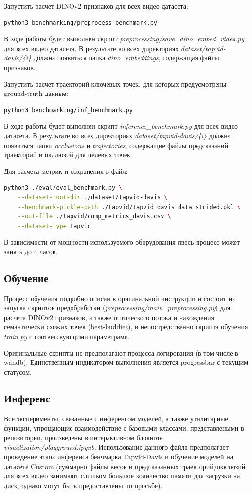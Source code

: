 \documentclass[a4paper, 14pt]{extarticle}
\theoremstyle{definition}
\theoremstyle{plain}
\theoremstyle{remark}
\begin{document}
Запустить расчет DINOv2 признаков для всех видео датасета:
\begin{lstlisting}[language=bash]
python3 benchmarking/preprocess_benchmark.py
\end{lstlisting}
В ходе работы будет выполнен скрипт \textit{preprocessing/save\_dino\_embed\_video.py} для всех видео датасета. В результате во всех директориях \textit{dataset/tapvid-davis/\{i\}} должна появиться папка \textit{dino\_embeddings}, содержащая файлы признаков.

Запустить расчет траекторий ключевых точек, для которых предусмотрены ground-truth данные:
\begin{lstlisting}[language=bash]
python3 benchmarking/inf_benchmark.py
\end{lstlisting}
В ходе работы будет выполнен скрипт \textit{inference\_benchmark.py} для всех видео датасета. В результате во всех директориях \textit{dataset/tapvid-davis/\{i\}} должнs появиться папки \textit{occlusions} и \textit{trajectories}, содержащие файлы предсказаний траекторий и окллюзий для целевых точек.

Для расчета метрик и сохранения в файл:
\begin{lstlisting}[language=bash]
python3 ./eval/eval_benchmark.py \
    --dataset-root-dir ./dataset/tapvid-davis \
    --benchmark-pickle-path ./tapvid/tapvid_davis_data_strided.pkl \
    --out-file ./tapvid/comp_metrics_davis.csv \
    --dataset-type tapvid 
\end{lstlisting}

В зависимости от мощности используемого оборудования пвесь процесс может занять до 4 часов.

\subsection{Обучение}
Процесс обучения подробно описан в оригинальной инструкции и состоит из запуска скриптов предобработки (\textit{preprocessing/main\_preprocessing.py}) для расчета DINOv2 признаков, а также оптического потока и нахождения семантически схожих точек (best-buddies), и непостредственно скрипта обучения \textit{train.py} с соответсвующими параметрами.

Оригинальные скрипты не предполагают процесса логирования (в том числе в wandb). Единственным индикатором выполнения является progressbar с текущим статусом.

\subsection{Инференс}
Все эксперименты, связанные с инференсом моделей, а также утилитарные функции, упрощающие взаимодействие с базовыми классами, представлеными в репозитории, произведены в интерактивном блокноте \\ \textit{visualization/playground.ipynb}. Использование данного файла предполагает проведение этапа инференса бенчмарка Tapvid-Davis и обучение моделей на датасете Custom (суммарно файлы весов и предсказанных траекторий/окклюзий для всех видео занимают слишком большое количество памяти для загрузки на диск, однако могут быть предоставлены по просьбе).
\end{document}
